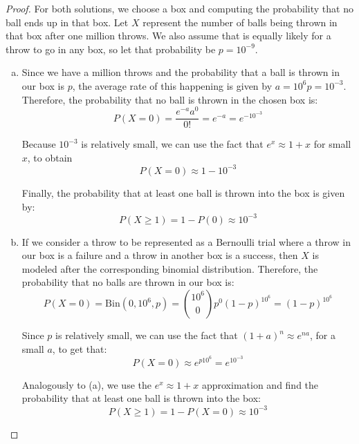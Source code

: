 \begin{proof}
    For both solutions, we choose a box and computing the probability that
    no ball ends up in that box. Let $X$ represent the number of balls
    being thrown in that box after one million throws. We also assume that 
    is equally likely for a throw to go in any box, so let that probability
    be $p = 10^{-9}$.

    \begin{enumerate}[(a)]
        \item Since we have a million throws and the probability that 
            a ball is thrown in our box is $p$, the average rate
            of this happening is given by $a = 10^6 p= 10^{-3}$.
            Therefore, the probability that no ball is thrown
            in the chosen box is:
            \[
                P(X = 0) = \frac{e^{-a}a^0}{0!} = e^{-a} = e^{-10^{-3}}
            \] 
            
            Because $10^{-3}$ is relatively small, we can use the fact that
            $e^x \approx 1 + x$ for small $x$, to obtain
            \[
                P(X = 0) \approx 1 - 10^{-3}
            \] 

            Finally, the probability that at least one ball is thrown
            into the box is given by:
            \[
                P(X \geq 1) = 1 - P(0) \approx 10^{-3}
            \] 

        \item If we consider a throw to be represented as a Bernoulli trial where
            a throw in our box is a failure and a throw in another box is a
            success, then $X$ is modeled after the corresponding binomial distribution.
            Therefore, the probability that no balls are thrown in our box is:
            \[
                P(X = 0) = \text{Bin}(0, 10^6, p) = \binom{10^6}{0} p^0 (1 - p)^{10^6}
                = (1 - p)^{10^6}
            \] 

            Since $p$ is relatively small, we can use the fact that $(1 + a)^n \approx e^{na}$, for
            a small $a$, to get that:
            \[
                P(X = 0) \approx e^{p10^6} = e^{10^{-3}}
            \] 

            Analogously to (a), we use the $e^x \approx 1 + x$ approximation and find
            the probability that at least one ball is thrown into the box:
            \[
                P(X \geq 1) = 1 - P(X = 0) \approx 10^{-3}
            \] 
    \end{enumerate}
\end{proof}

